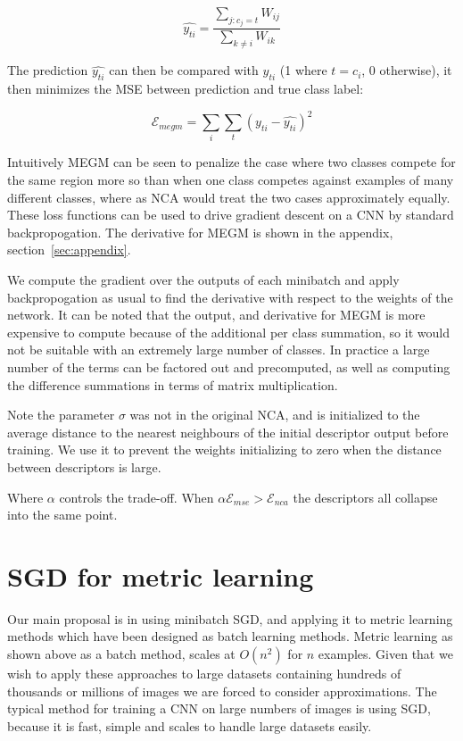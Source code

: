 \begin{equation}
\label{eq:megm_pred}
\hat{y_{ti}} = \frac{\sum_{j:c_j = t}W_{ij}}{\sum_{k \neq i}{W_{ik}}}
\end{equation}

The prediction $ \hat{y_{ti}} $ can then be compared with $ y_{ti} $ (1 where $ t = c_i $, 0 otherwise), it then minimizes the \gls{MSE} between prediction and true class label:

\begin{equation}
\label{eq:megm_loss}
\mathcal{E}_{megm} =  \sum_i\sum_t{(y_{ti} - \hat{y_{ti}})^2}
\end{equation}

Intuitively \gls{MEGM} can be seen to penalize the case where two classes compete for the same region more so than when one class competes against examples of many different classes, where as \gls{NCA} would treat the two cases approximately equally. These loss functions can be used to drive gradient descent on a \gls{CNN} by standard backpropogation. The derivative for \gls{MEGM} is shown in the appendix, section~\ref{sec:appendix}.

We compute the gradient over the outputs of each minibatch and apply backpropogation as usual to find the derivative with respect to the weights of the network. It can be noted that the output, and derivative for \gls{MEGM} is more expensive to compute because of the additional per class summation, so it would not be suitable with an extremely large number of classes. In practice a large number of the terms can be factored out and precomputed, as well as computing the difference summations in terms of matrix multiplication.

Note the parameter $ \sigma $ was not in the original NCA, and is initialized to the average distance to the nearest neighbours of the initial descriptor output before training. We use it to prevent the weights initializing to zero when the distance between descriptors is large.


Where $\alpha $ controls the trade-off. When $ \alpha \mathcal{E}_{mse} > \mathcal{E}_{nca} $ the descriptors all collapse into the same point.


\section{SGD for metric learning}

Our main proposal is in using minibatch \gls{SGD}, and applying it to metric learning methods which have been designed as batch learning methods. Metric learning as shown above as a batch method, scales at $ O(n^2) $ for $ n $ examples. Given that we wish to apply these approaches to large datasets containing hundreds of thousands or millions of images we are forced to consider approximations. The typical method for training a \gls{CNN} on large numbers of images is using \gls{SGD}, because it is fast, simple and scales to handle large datasets easily. 

